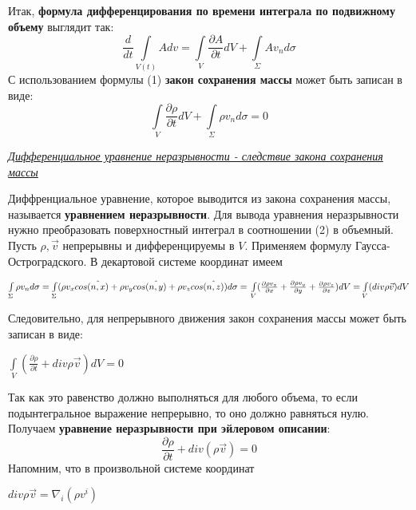 Итак, \textbf{формула дифференцирования по времени интеграла по подвижному объему} выглядит так:
\begin{equation}
  \frac{d}{dt}\int\limits_{V(t)}A dv= \int\limits_V \frac{\partial A}{\partial t} dV + \int\limits_{\Sigma}A v_n d\sigma
\end{equation}
С использованием формулы (1) \textbf{закон сохранения массы} может быть записан в виде:
\begin{equation}
  \int\limits_V \frac{\partial \rho}{\partial t} dV + \int\limits_{\Sigma}\rho v_n d \sigma = 0
\end{equation}

\begin{center}
  \textit{\underline{Дифференциальное уравнение неразрывности - следствие закона сохранения массы}}
\end{center}
Диффренциальное уравнение, которое выводится из закона сохранения массы, называется \textbf{уравнением неразрывности}. Для вывода уравнения неразрывности нужно преобразовать поверхностный интеграл в соотношении (2) в объемный. Пусть $\rho, \Vec{v}$ непрерывны и дифференцируемы в $V$. Применяем формулу Гаусса-Остроградского. В декартовой системе координат имеем
\begin{center}$
    \int\limits_{\Sigma} \rho v_n d \sigma
    = \int\limits_{\Sigma} (\rho v_x cos \hat{(n,x)} + \rho v_y cos \hat{(n,y)} + \rho v_z cos \hat{(n,z)})d \sigma
    =\newline
    \int\limits_V ( \frac{\partial \rho v_x}{\partial x} + \frac{\partial \rho v_y}{\partial y} + \frac{\partial \rho v_z}{\partial z})dV
    =
    \int\limits_V (div \rho \Vec{v})dV
  $\end{center}
Следовительно, для непрерывного движения закон сохранения массы может быть записан в виде:
\begin{center}$
    \int\limits_V (\frac{\partial \rho}{\partial t} + div \rho \Vec{v})dV = 0
  $\end{center}
Так как это равенство должно выполняться для любого объема, то если подынтегральное выражение непрерывно, то оно должно равняться нулю. Получаем
\textbf{уравнение неразрывности при эйлеровом описании}:
\begin{equation}
  \frac{\partial \rho}{\partial t} + div (\rho \Vec{v}) = 0
\end{equation}
Напомним, что в произвольной системе координат
\begin{center}$
    div \rho \Vec{v} = \nabla_i(\rho v^i)
  $\end{center}
